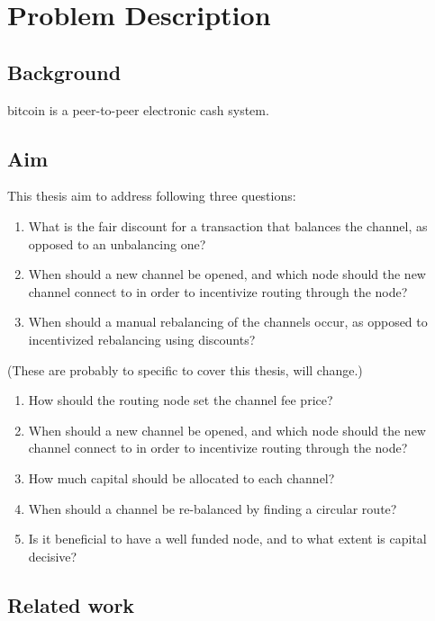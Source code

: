 \chapter{Problem Description}

\section{Background}
    \label{sec:background}

\gls{bitcoin} is a peer-to-peer electronic cash system. 

\section{Aim}
    \label{sec:aim}

This thesis aim to address following three questions:

    \begin{enumerate}
	\item What is the fair discount for a transaction that balances the channel, as
		opposed to an unbalancing one?
	\item When should a new channel be opened, and which node should the new
		channel connect to in order to incentivize routing through the node?
	\item When should a manual rebalancing of the channels occur, as opposed to
		incentivized rebalancing using discounts?
    \end{enumerate}
	(These are probably to specific to cover this thesis, will change.)
	
	 \begin{enumerate}
		\item How should the routing node set the channel fee price?
		\item When should a new channel be opened, and which node should the new
		channel connect to in order to incentivize routing through the node?
		\item How much capital should be allocated to each channel?
		\item When should a channel be re-balanced by finding a circular route?
		\item Is it beneficial to have a well funded node, and to what extent is capital decisive?
	\end{enumerate}
	
\section{Related work}
    \label{sec:related_work}

